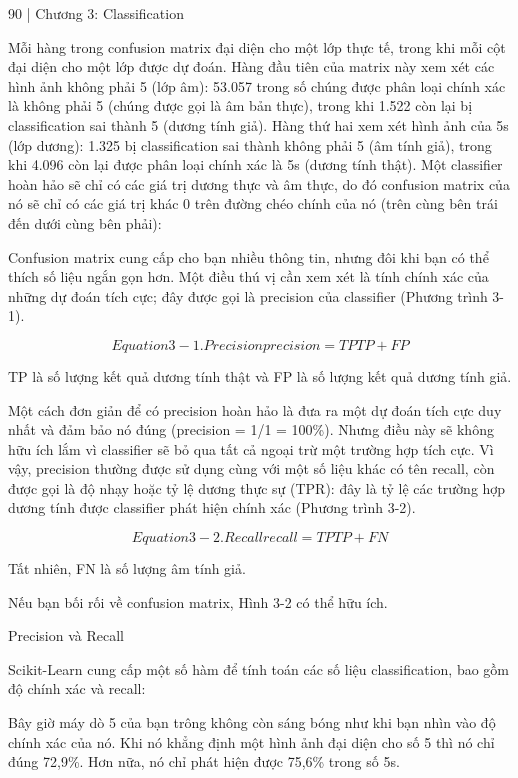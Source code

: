 90 | Chương 3: Classification

Mỗi hàng trong confusion matrix đại diện cho một lớp thực tế, trong khi mỗi cột đại diện cho một lớp được dự đoán. Hàng đầu tiên của matrix này xem xét các hình ảnh không phải 5 (lớp âm): 53.057 trong số chúng được phân loại chính xác là không phải 5 (chúng được gọi là âm bản thực), trong khi 1.522 còn lại bị classification sai thành 5 (dương tính giả). Hàng thứ hai xem xét hình ảnh của 5s (lớp dương): 1.325 bị classification sai thành không phải 5 (âm tính giả), trong khi 4.096 còn lại được phân loại chính xác là 5s (dương tính thật). Một classifier hoàn hảo sẽ chỉ có các giá trị dương thực và âm thực, do đó confusion matrix của nó sẽ chỉ có các giá trị khác 0 trên đường chéo chính của nó (trên cùng bên trái đến dưới cùng bên phải):

Confusion matrix cung cấp cho bạn nhiều thông tin, nhưng đôi khi bạn có thể thích số liệu ngắn gọn hơn. Một điều thú vị cần xem xét là tính chính xác của những dự đoán tích cực; đây được gọi là precision của classifier (Phương trình 3-1).

\[Equation 3-1. Precision precision = TP TP + FP\]

TP là số lượng kết quả dương tính thật và FP là số lượng kết quả dương tính giả.

Một cách đơn giản để có precision hoàn hảo là đưa ra một dự đoán tích cực duy nhất và đảm bảo nó đúng (precision = 1/1 = 100\%). Nhưng điều này sẽ không hữu ích lắm vì classifier sẽ bỏ qua tất cả ngoại trừ một trường hợp tích cực. Vì vậy, precision thường được sử dụng cùng với một số liệu khác có tên recall, còn được gọi là độ nhạy hoặc tỷ lệ dương thực sự (TPR): đây là tỷ lệ các trường hợp dương tính được classifier phát hiện chính xác (Phương trình 3-2).

\[Equation 3-2. Recall recall = TP TP + FN\]

Tất nhiên, FN là số lượng âm tính giả.

Nếu bạn bối rối về confusion matrix, Hình 3-2 có thể hữu ích.

Precision và Recall

Scikit-Learn cung cấp một số hàm để tính toán các số liệu classification, bao gồm độ chính xác và recall:

Bây giờ máy dò 5 của bạn trông không còn sáng bóng như khi bạn nhìn vào độ chính xác của nó. Khi nó khẳng định một hình ảnh đại diện cho số 5 thì nó chỉ đúng 72,9\%. Hơn nữa, nó chỉ phát hiện được 75,6\% trong số 5s.

